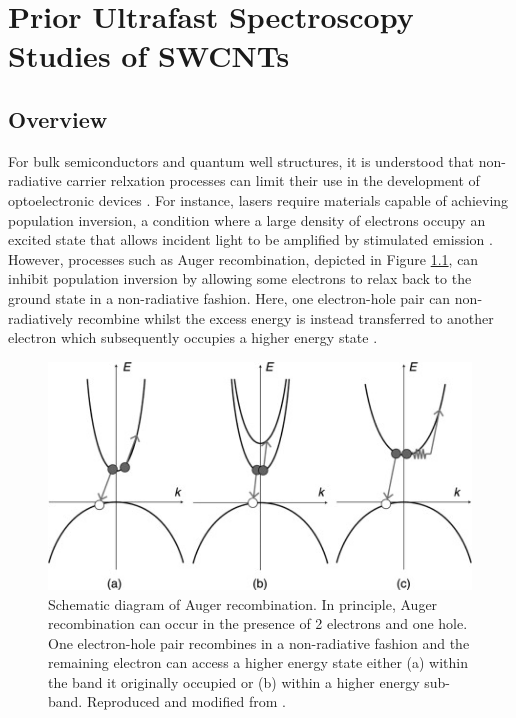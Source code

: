 \chapter{Prior Ultrafast Spectroscopy Studies of SWCNTs}

\section{Overview}

For bulk semiconductors and quantum well structures, it is understood that non-radiative carrier relxation processes can limit their use in the development of optoelectronic devices \cite{agrawal1986long, roulston1990bipolar, green1995silicon}. For instance, lasers require materials capable of achieving population inversion, a condition where a large density of electrons occupy an excited state that allows incident light to be amplified by stimulated emission \cite{agrawal1986long, siegman1986lasers}. However, processes such as Auger recombination, depicted in Figure \ref{fig:auger_recomb_meyaard}, can inhibit population inversion by allowing some electrons to relax back to the ground state in a non-radiative fashion. Here, one electron-hole pair can non-radiatively recombine whilst the excess energy is instead transferred to another electron which subsequently occupies a higher energy state \cite{beattie1959auger}.

\begin{figure}
	\centering
	\includegraphics[trim = 0 0 3.2cm 0, clip]{images/chapter_prior_works/auger_schematic_meyaard}
	\caption{Schematic diagram of Auger recombination. In principle, Auger recombination can occur in the presence of 2 electrons and one hole. One electron-hole pair recombines in a non-radiative fashion and the remaining electron can access a higher energy state either (a) within  the band it originally occupied or (b) within a higher energy sub-band. Reproduced and modified from \cite{meyaard2014efficiency}. }
	\label{fig:auger_recomb_meyaard}
\end{figure}

